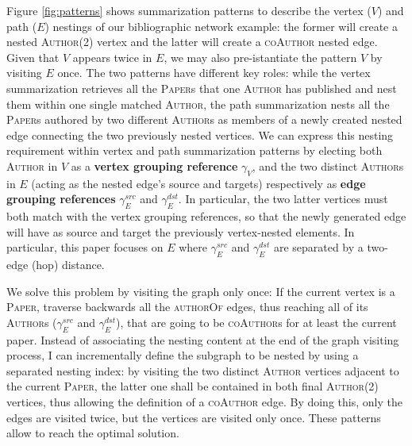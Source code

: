 \begin{ex}[label=ex2,continues=ex1]
	Figure \ref{fig:patterns} shows summarization patterns to describe the vertex ($V$) and path ($E$) nestings of our bibliographic network example: the former will create a nested \textsc{Author}(2) vertex and the latter will create a \textsc{coAuthor} nested edge. Given that $V$ appears twice in $E$, we may also pre-istantiate the pattern $V$ by visiting $E$ once. The two patterns have different key roles: while the vertex summarization retrieves all the \textsc{Paper}s that one \textsc{Author} has published and nest them within one single matched \textsc{Author}, the path summarization nests all the \textsc{Paper}s authored by two different \textsc{Author}s as members of a newly created nested edge connecting the two previously nested vertices. %
	We can express this nesting requirement within vertex and path summarization patterns by electing both  \textsc{Author} in $V$ as a \textbf{vertex grouping reference} $\gamma_V$, and the two distinct \textsc{Author}s in $E$ (acting as the nested edge's source and targets) respectively as \textbf{edge grouping references} $\gamma_E^{src}$ and $\gamma_E^{dst}$. In particular, the two latter vertices must both match
	with the vertex grouping references, so that the newly generated edge will have as source and target the previously vertex-nested elements. In particular, this paper focuses on $E$ where $\gamma_E^{src}$  and $\gamma_E^{dst}$ are separated by a two-edge (hop) distance.
	
	
	We solve this problem by visiting the graph only once: %
	If the current vertex is a \textsc{Paper}, traverse backwards all the \textsc{authorOf} edges, thus reaching all of its \textsc{Author}s ($\gamma_E^{src}$ and $\gamma_E^{dst}$), that are going to be \textsc{coAuthor}s for at least the current paper. Instead of associating the nesting content at the end of the graph visiting process, I can incrementally define the subgraph to be nested by using a separated nesting index: by visiting the two distinct \textsc{Author} vertices adjacent to the current \textsc{Paper}, the latter one shall be contained in both final \textsc{Author}(2) vertices, thus allowing the definition of a  \textsc{coAuthor} edge. %
	By doing this, only the edges are visited twice, but the vertices are visited only once. These patterns allow to reach the optimal solution.
	

\end{ex}
